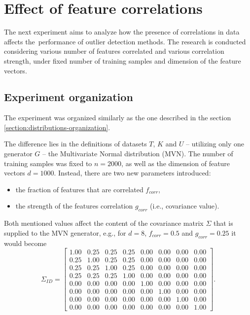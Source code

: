 \section{Effect of feature correlations}
\label{section:correlations-experiment}

The next experiment aims to analyze how the presence of correlations in data affects the~performance of outlier detection methods. The research is conducted considering various number of features correlated and various correlation strength, under fixed number of training samples and dimension of the feature vectors.


\subsection{Experiment organization}
\label{section:correlations-organization}

The experiment was organized similarly as the one described in the section \ref{section:distributions-organization}.

The difference lies in the definitions of datasets $T$, $K$ and $U$ – utilizing only one generator $G$ – the Multivariate Normal distribution (MVN). The number of training samples was fixed to $n = 2000$, as well as the dimension of feature vectors $d = 1000$. Instead, there are two new parameters introduced:
\vspace{-0.5\baselineskip}
\begin{itemize}
    \item the fraction of features that are correlated $f_{corr}$,
    \item the strength of the features correlation $g_{corr}$ (i.e., covariance value).
\end{itemize}

Both mentioned values affect the content of the covariance matrix $\Sigma$ that is supplied to the MVN generator, e.g., for $d = 8$, $f_{corr} = 0.5$ and $g_{corr} = 0.25$ it would become
\begin{equation}
    \Sigma_{ID}
    =
    \begin{bmatrix}
        \mathbf{1.00} & \mathbf{0.25} & \mathbf{0.25} & \mathbf{0.25} & 0.00 & 0.00 & 0.00 & 0.00 \\
        \mathbf{0.25} & \mathbf{1.00} & \mathbf{0.25} & \mathbf{0.25} & 0.00 & 0.00 & 0.00 & 0.00 \\
        \mathbf{0.25} & \mathbf{0.25} & \mathbf{1.00} & \mathbf{0.25} & 0.00 & 0.00 & 0.00 & 0.00 \\
        \mathbf{0.25} & \mathbf{0.25} & \mathbf{0.25} & \mathbf{1.00} & 0.00 & 0.00 & 0.00 & 0.00 \\
        0.00 & 0.00 & 0.00 & 0.00 & \mathbf{1.00} & 0.00 & 0.00 & 0.00 \\
        0.00 & 0.00 & 0.00 & 0.00 & 0.00 & \mathbf{1.00} & 0.00 & 0.00 \\
        0.00 & 0.00 & 0.00 & 0.00 & 0.00 & 0.00 & \mathbf{1.00} & 0.00 \\
        0.00 & 0.00 & 0.00 & 0.00 & 0.00 & 0.00 & 0.00 & \mathbf{1.00}
    \end{bmatrix}
    .
    \label{eq:corr-example}
\end{equation}

